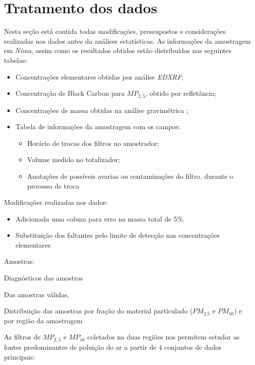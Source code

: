 \section{Tratamento dos dados}

Nesta seção está contida todas modificações, pressupostos e considerações 
realizadas nos dados antes da análises estatísticas.
As informações da amostragem em \textit{Nima}, assim como os resultados obtidos
estão distribuídos nas seguintes tabelas: 

\begin{itemize}
  \item Concentrações elementares obtidas por análise \textit{EDXRF};
  \item Concentração de Black Carbon para $MP_{2,5}$, obtido por refletância;
  \item Concentrações de massa obtidas na análise gravimétrica ;
  \item Tabela de informações da amostragem com os campos:
  \begin{itemize}
    \item Horário de trocas dos filtros no amostrador;
    \item Volume medido no totalizador;
    \item Anotações de possíveis avarias ou contaminações do filtro.
          durante o processo de troca
  \end{itemize}
\end{itemize}

Modificações realizadas nos dados:
\begin{itemize}
\item Adicionada uma coluna para erro na massa total de 5\%.
\item Substituição dos faltantes pelo limite de detecção nas 
      concentrações elementares
\end{itemize}

Amostras:
\begin{table}[H]
  \centering
  
  \caption{Diagnósticos das amostras}
\end{table}

Das amostras válidas, 
\begin{table}[H]
  \centering
  
  \caption{Distribuição das amostras por fração do material particulado 
  ($PM_{2.5}$ e $PM_{10}$) e por região da amostragem}
\end{table}

As filtros de $MP_{2,5}$ e $MP_{10}$ coletados na duas regiões nos permitem 
estudar as fontes predominantes de poluição do ar a partir de 4 
conjuntos de dados principais: 

